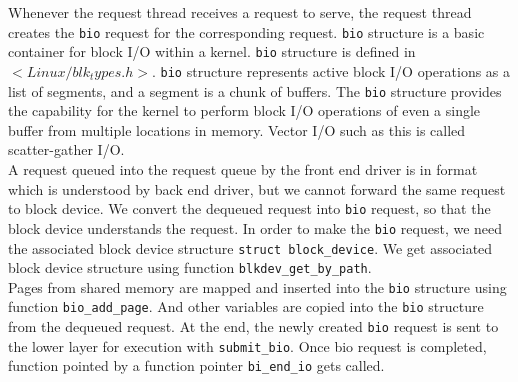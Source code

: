 \label{subsec:createbio}
Whenever the request thread receives a request to serve, the request thread creates the \texttt{bio} request for the corresponding request. \texttt{bio} structure is a basic container for block I/O within a kernel. \texttt{bio} structure is defined in \texttt{$<Linux/blk_types.h>$}. \texttt{bio} structure represents active block I/O operations as a list of segments, and a segment is a chunk of buffers. The \texttt{bio} structure provides the capability for the kernel to perform block I/O operations of even a single buffer from multiple locations in memory. Vector I/O such as this is called scatter-gather I/O.
\\
A request queued into the request queue by the front end driver is in format which is understood by back end driver, but we cannot forward the same request to block device. We convert the dequeued request into \texttt{bio} request, so that the block device understands the request. In order to make the \texttt{bio} request, we need the associated block device structure \texttt{struct block\_device}. We get associated block device structure using function \texttt{blkdev\_get\_by\_path}. 
\\
Pages from shared memory are mapped and inserted into the \texttt{bio} structure using function \texttt{bio\_add\_page}. And other variables are copied into the \texttt{bio} structure from the dequeued request. At the end, the newly created \texttt{bio} request is sent to the lower layer for execution with \texttt{submit\_bio}. Once bio request is completed, function pointed by a function pointer \texttt{bi\_end\_io} gets called.

